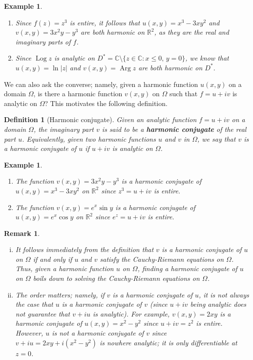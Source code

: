 \documentclass[10pt]{article}
\newcommand{\R}{\mathbb{R}}
\newcommand{\C}{\mathbb{C}}
\DeclareMathOperator{\Arg}{Arg}
\DeclareMathOperator{\Log}{Log}
\theoremstyle{newstyle}
\newtheorem{remark}[thm]{Remark}
\newtheorem{defn}[thm]{Definition}
\newtheorem{exmp}[thm]{Example}
\begin{document}
\begin{exmp}~
\begin{enumerate}[(1)]
    \item Since $f(z) = z^3$ is entire, it follows that $u(x, y) = x^3 - 3xy^2$ and 
    $v(x, y) = 3x^2y - y^3$ are both harmonic on $\R^2$, as they are the real and 
    imaginary parts of $f$.
    \item Since $\Log z$ is analytic on $D^* = \C \setminus \{z \in \C : x \leq 0,\, y = 0\}$, 
    we know that $u(x, y) = \ln|z|$ and $v(x, y) = \Arg z$ are both harmonic on $D^*$. 
\end{enumerate}
\end{exmp}

We can also ask the converse; namely, given a harmonic function $u(x, y)$ on a domain $\Omega$, 
is there a harmonic function $v(x, y)$ on $\Omega$ such that $f = u+iv$ is analytic on $\Omega$?
This motivates the following definition. 

\begin{defn}[Harmonic conjugate]
Given an analytic function $f = u+iv$ on a domain $\Omega$, the imaginary part $v$ is said 
to be a {\bf harmonic conjugate} of the real part $u$. Equivalently, given two harmonic 
functions $u$ and $v$ in $\Omega$, we say that $v$ is a harmonic conjugate of $u$ if 
$u+iv$ is analytic on $\Omega$. 
\end{defn}

\begin{exmp}~
\begin{enumerate}[(1)]
    \item The function $v(x, y) = 3x^2y - y^3$ is a harmonic conjugate of $u(x, y) = x^3 - 
    3xy^2$ on $\R^2$ since $z^3 = u+iv$ is entire. 
    \item The function $v(x, y) = e^x \sin y$ is a harmonic conjugate of $u(x, y) = e^x \cos y$ 
    on $\R^2$ since $e^z = u+iv$ is entire. 
\end{enumerate}
\end{exmp}

\begin{remark}~
\begin{enumerate}[(i)]
    \item It follows immediately from the definition that $v$ is a harmonic conjugate of $u$ 
    on $\Omega$ if and only if $u$ and $v$ satisfy the Cauchy-Riemann equations on $\Omega$. 
    Thus, given a harmonic function $u$ on $\Omega$, finding a harmonic conjugate of $u$ on 
    $\Omega$ boils down to solving the Cauchy-Riemann equations on $\Omega$. 
    \item The order matters; namely, if $v$ is a harmonic conjugate of $u$, it is not 
    always the case that $u$ is a harmonic conjugate of $v$ (since $u + iv$ being analytic 
    does not guarantee that $v + iu$ is analytic). For example, $v(x, y) = 2xy$ is a 
    harmonic conjugate of $u(x, y) = x^2 - y^2$ since $u + iv = z^2$ is entire. 
    However, $u$ is not a harmonic conjugate of $v$ since $v + iu = 2xy + i(x^2 - y^2)$ 
    is nowhere analytic; it is only differentiable at $z = 0$. 
\end{enumerate}
\end{remark}
\end{document}
